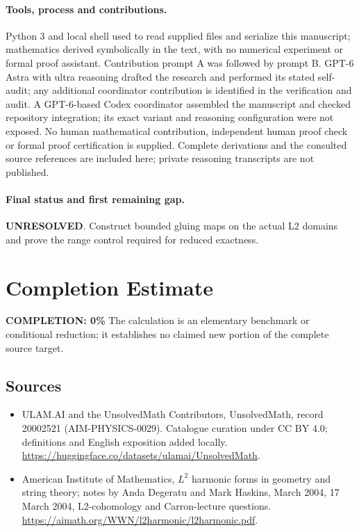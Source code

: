 \documentclass[11pt]{article}
\begin{document}
\paragraph{Tools, process and contributions.}
Python 3 and local shell used to read supplied files and serialize this manuscript; mathematics derived symbolically in the text, with no numerical experiment or formal proof assistant. Contribution prompt A was followed by prompt B. GPT-6 Astra with ultra reasoning drafted the research and performed its stated self-audit; any additional coordinator contribution is identified in the verification and audit. A GPT-6-based Codex coordinator assembled the manuscript and checked repository integration; its exact variant and reasoning configuration were not exposed. No human mathematical contribution, independent human proof check or formal proof certification is supplied. Complete derivations and the consulted source references are included here; private reasoning transcripts are not published.

\paragraph{Final status and first remaining gap.}
\textbf{UNRESOLVED}. Construct bounded gluing maps on the actual L2 domains and prove the range control required for reduced exactness.

\section{Completion Estimate}
\noindent\textbf{COMPLETION: 0\%}
The calculation is an elementary benchmark or conditional reduction; it establishes no claimed new portion of the complete source target.

\subsection{Sources}
\begin{itemize}
\item[\hypertarget{source:20002521:1}{S1}] ULAM.AI and the UnsolvedMath Contributors, UnsolvedMath, record 20002521 (AIM-PHYSICS-0029). Catalogue curation under CC BY 4.0; definitions and English exposition added locally.
\url{https://huggingface.co/datasets/ulamai/UnsolvedMath}.
\item[\hypertarget{source:20002521:2}{S2}] American Institute of Mathematics, $L^2$ harmonic forms in geometry and string theory; notes by Anda Degeratu and Mark Haskins, March 2004, 17 March 2004, L2-cohomology and Carron-lecture questions.
\url{https://aimath.org/WWN/l2harmonic/l2harmonic.pdf}.
\end{itemize}
\label{end:20002521}
\end{document}
